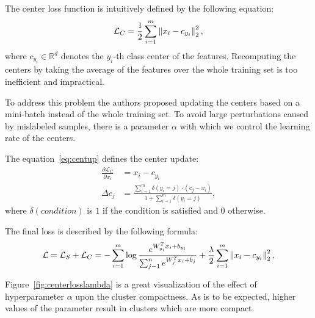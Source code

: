 The center loss function is intuitively defined by the following equation:
\begin{equation}
    \label{eq:center}
    \mathcal{L}_C = \frac{1}{2} \sum_{i=1}^{m} \left\lVert x_i - c_{y_i}\right\rVert_2^2,
\end{equation}
where $c_{y_i} \in \mathbb{R}^{d}$ denotes the $y_i$-th class center of the features.
Recomputing the centers by taking the average of the features over the whole training set is too inefficient and
impractical.

To address this problem the authors proposed updating the centers based on a mini-batch instead of the whole training
set.
To avoid large perturbations caused by mislabeled samples, there is a parameter $\alpha$ with which we control the
learning rate of the centers.

The equation~\ref{eq:centup} defines the center update:
\begin{align}
    \frac{\partial \mathcal{L}_C}{\partial x_i} &= x_i - c_{y_i} \\
    \Delta c_j &= \frac{\sum_{i=1}^m \delta(y_i=j) \cdot (c_j-x_i)}{1+\sum_{i=1}^m \delta(y_i=j)}, \label{eq:centup}
\end{align}
where $\delta(condition)$ is $1$ if the condition is satisfied and $0$ otherwise.

The final loss is described by the following formula:
\begin{equation}
    \label{eq:centerloss}
    \mathcal{L} = \mathcal{L}_S + \mathcal{L}_C = -\sum_{i=1}^{m} \log \frac{e^{W^T_{y_i} x_{i} + b_{y_i}}}
    {\sum_{j-1}^{n} e^{W^T_{j} x_{i} + b_{j}}} + \frac{\lambda}{2} \sum_{i=1}^{m} \left\lVert x_i - c_{y_i}\right\rVert_2^2,
\end{equation}

Figure~\ref{fig:centerlosslambda} is a great visualization of the effect of hyperparameter $\alpha$ upon the cluster
compactness.
As is to be expected, higher values of the parameter result in clusters which are more compact.

